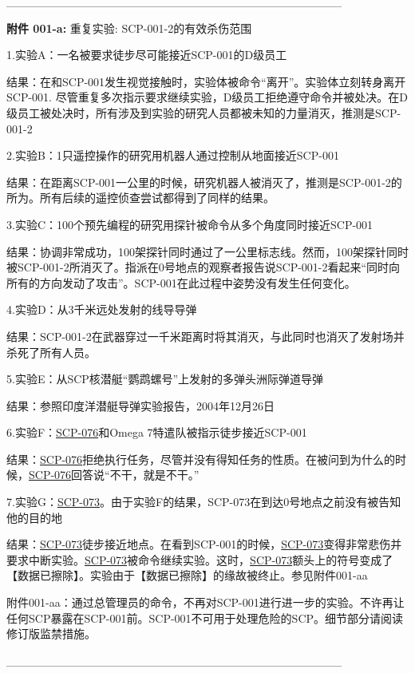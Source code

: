 \documentclass[openany,a4paper]{book} %
\begin{document}
________________________________________

\textbf{附件 001-a:} 重复实验: SCP-001-2的有效杀伤范围

1.实验A：一名被要求徒步尽可能接近SCP-001的D级员工

结果：在和SCP-001发生视觉接触时，实验体被命令“离开”。实验体立刻转身离开SCP-001. 尽管重复多次指示要求继续实验，D级员工拒绝遵守命令并被处决。在D级员工被处决时，所有涉及到实验的研究人员都被未知的力量消灭，推测是SCP-001-2

2.实验B：1只遥控操作的研究用机器人通过控制从地面接近SCP-001

结果：在距离SCP-001一公里的时候，研究机器人被消灭了，推测是SCP-001-2的所为。所有后续的遥控侦查尝试都得到了同样的结果。

3.实验C：100个预先编程的研究用探针被命令从多个角度同时接近SCP-001

结果：协调非常成功，100架探针同时通过了一公里标志线。然而，100架探针同时被SCP-001-2所消灭了。指派在0号地点的观察者报告说SCP-001-2看起来“同时向所有的方向发动了攻击”。SCP-001在此过程中姿势没有发生任何变化。

4.实验D：从3千米远处发射的线导导弹

结果：SCP-001-2在武器穿过一千米距离时将其消灭，与此同时也消灭了发射场并杀死了所有人员。

5.实验E：从SCP核潜艇“鹦鹉螺号”上发射的多弹头洲际弹道导弹

结果：参照印度洋潜艇导弹实验报告，2004年12月26日

6.实验F：\hyperref[chap:SCP-076]{SCP-076}和Omega 7特遣队被指示徒步接近SCP-001

结果：\hyperref[chap:SCP-076]{SCP-076}拒绝执行任务，尽管并没有得知任务的性质。在被问到为什么的时候，\hyperref[chap:SCP-076]{SCP-076}回答说“不干，就是不干。”

7.实验G：\hyperref[chap:SCP-073]{SCP-073}。由于实验F的结果，SCP-073在到达0号地点之前没有被告知他的目的地

结果：\hyperref[chap:SCP-073]{SCP-073}徒步接近地点。在看到SCP-001的时候，\hyperref[chap:SCP-073]{SCP-073}变得非常悲伤并要求中断实验。\hyperref[chap:SCP-073]{SCP-073}被命令继续实验。这时，\hyperref[chap:SCP-073]{SCP-073}额头上的符号变成了【数据已擦除】。实验由于【数据已擦除】的缘故被终止。参见附件001-aa

附件001-aa：通过总管理员的命令，不再对SCP-001进行进一步的实验。不许再让任何SCP暴露在SCP-001前。SCP-001不可用于处理危险的SCP。细节部分请阅读修订版监禁措施。

________________________________________\vspace{12pt}
\end{document}
